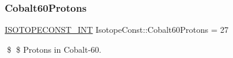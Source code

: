 \subsubsection{\texorpdfstring{Cobalt60\+Protons}{Cobalt60Protons}}
{\footnotesize\ttfamily \mbox{\hyperlink{group___isotope_const-_macros_ga5f18360b3e99483a35c32d789e62621c}{I\+S\+O\+T\+O\+P\+E\+C\+O\+N\+S\+T\+\_\+\+I\+NT}} Isotope\+Const\+::\+Cobalt60\+Protons = 27}

\$ \$ Protons in Cobalt-\/60. 